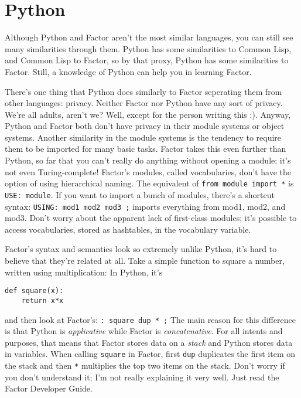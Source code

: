 \documentclass{article}
\begin{document}
\section{Python}

Although Python and Factor aren't the most similar languages, you can still see many similarities through them. Python has some similarities to Common Lisp, and Common Lisp to Factor, so by that proxy, Python has some similarities to Factor. Still, a knowledge of Python can help you in learning Factor.

There's one thing that Python does similarly to Factor seperating them from other languages: privacy. Neither Factor nor Python have any sort of privacy. We're all adults, aren't we? Well, except for the person writing this :). Anyway, Python and Factor both don't have privacy in their module systems or object systems. Another similarity in the module systems is the tendency to require them to be imported for many basic tasks. Factor takes this even further than Python, so far that you can't really do anything without opening a module; it's not even Turing-complete! Factor's modules, called vocabularies, don't have the option of using hierarchical naming. The equivalent of \verb|from module import *| is \verb|USE: module|. If you want to import a bunch of modules, there's a shortcut syntax: \verb|USING: mod1 mod2 mod3 ;| imports everything from mod1, mod2, and mod3. Don't worry about the apparent lack of first-class modules; it's possible to access vocabularies, stored as hashtables, in the vocabulary variable.

Factor's syntax and semantics look so extremely unlike Python, it's hard to believe that they're related at all. Take a simple function to square a number, written using multiplication: In Python, it's
\begin{verbatim}
def square(x):
    return x*x
\end{verbatim}
and then look at Factor's: \verb|: square dup * ;| The main reason for this difference is that Python is \emph{applicative} while Factor is \emph{concatenative}. For all intents and purposes, that means that Factor stores data on a \emph{stack} and Python stores data in variables. When calling \texttt{square} in Factor, first \texttt{dup} duplicates the first item on the stack and then \texttt{*} multiplies the top two items on the stack. Don't worry if you don't understand it; I'm not really explaining it very well. Just read the Factor Developer Guide.
\end{document}
